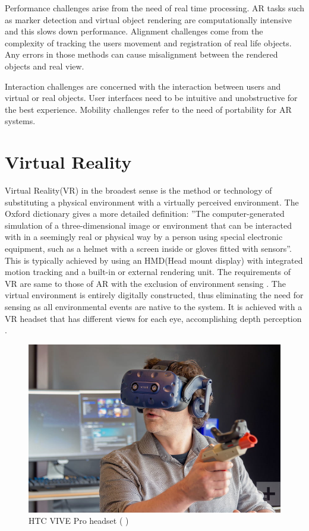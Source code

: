 \documentclass[12pt, a4paper,oneside, nocenter]{thesis}
\renewcommand{\citeyearpar}[1]{(\citeauthor{#1} \citeyear{#1})}
\begin{document}
Performance challenges arise from the need of real time processing. AR tasks such as marker detection
and virtual object rendering are computationally intensive and this slows down performance.
Alignment challenges come from the complexity of tracking the users movement and registration of real
life objects. Any errors in those methods can cause misalignment between the rendered objects and
real view.\par
Interaction challenges are concerned with the interaction between users and virtual or real objects.
User interfaces need to be intuitive and unobstructive for the best experience. Mobility challenges refer
to the need of portability for AR systems.
\\
\section{Virtual Reality}
Virtual Reality(VR) in the broadest sense is the method or technology of substituting a physical environment with a virtually perceived environment. The Oxford dictionary gives a more detailed definition: 
''The computer-generated simulation of a three-dimensional image or environment that can be interacted with in a seemingly real or physical way by a person using special electronic equipment, such as a helmet with a screen inside or gloves fitted with sensors''.
This is typically achieved by using an HMD(Head mount display) with integrated motion tracking and a built-in or external rendering unit.
The requirements of VR are same to those of AR with the exclusion of environment sensing . The virtual environment
is entirely digitally constructed, thus eliminating the need for sensing as all environmental events are native to the system. It is achieved with a VR headset that has different views for each eye, accomplishing depth perception .
\begin{figure}[H]
	\includegraphics[width=\textwidth]{htc-vive-pro-headset}
	\caption{HTC VIVE Pro headset \citeyearpar{htc-vive-pro-review}}
	\label{fig:htc-vive-pro-headset}
\end{figure}
\end{document}
